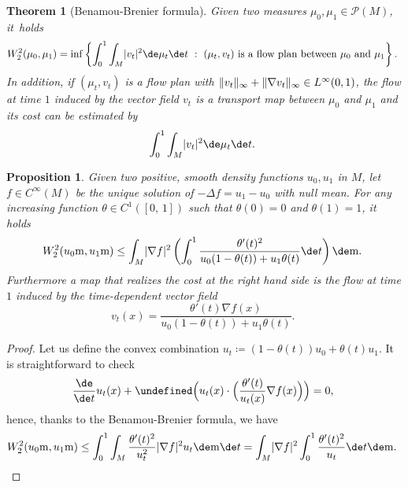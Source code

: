 \documentclass[10pt]{amsart}
\theoremstyle{plain}
\newtheorem{theorem}[theorem]{Theorem}
\newtheorem{proposition}[proposition]{Proposition}
\theoremstyle{definition}
\numberwithin{equation}{section}
\newcommand{\defeq}{\ensuremath{\coloneqq}}
\newcommand{\lapl}{\ensuremath{\Delta}}
\newcommand{\prob}{\ensuremath{\mathcal{P}}}
\newcommand{\cc}[2]{\ensuremath{\left[#1,\,#2\right]}}
\renewcommand{\comma}{\ensuremath{\text{, }}}
\newcommand{\comma}{\ensuremath{\text{, }}}
\newcommand{\fullstop}{\ensuremath{\text{. }}}
\newcommand{\st}{\ensuremath{\ :\ }}
\newcommand{\m}{\ensuremath{\mathrm m}}
\let\div\undefined
\DeclareMathOperator{\div}{div}
\DeclarePairedDelimiter\abs{\lvert}{\rvert}
\DeclarePairedDelimiter\norm{\lVert}{\rVert}
\begin{document}
\begin{theorem}[Benamou-Brenier formula]
Given two measures $\mu_0,\mu_1\in\prob(M)$, it~holds
\begin{equation*}
W_2^2(\mu_0, \mu_1) =
\inf\left\{\int_0^1\int_M \abs{v_t}^2\de\mu_t \de t\st (\mu_t, v_t)\text{ is a flow plan
between $\mu_0$ and $\mu_1$}\right\}\fullstop
\end{equation*}
In addition, if $(\mu_t, v_t)$ is a flow plan with $\norm{v_t}_\infty+\norm{\nabla v_t}_\infty\in L^\infty(0,1)$, the flow at time $1$ induced by the vector
field $v_t$ is a transport map between $\mu_0$ and $\mu_1$ and its cost can be estimated by
\begin{equation*}
\int_0^1\int_M \abs{v_t}^2\de\mu_t \de t\fullstop
\end{equation*}
\end{theorem}

\begin{proposition}\label{prop:transport_bound}
Given two positive, smooth density functions $u_0, u_1$ in $M$, let $f\in C^\infty(M)$ be the unique solution
of $-\lapl f = u_1-u_0$ with null mean.
For any increasing function $\theta\in C^1(\cc01)$ such that $\theta(0)=0$ and $\theta(1)=1$, it holds
\begin{equation*}
W_2^2(u_0\m, u_1\m)
\le \int_M\abs{\nabla f}^2
\left(\int_0^1\frac{\theta'(t)^2}{u_0(1-\theta(t))+u_1\theta(t)}\de t\right)
\de\m \fullstop
\end{equation*}
Furthermore a map that realizes the cost at the right hand side is the flow at time $1$ induced
by the time-dependent vector field
\begin{equation*}
v_t(x) = \frac{\theta'(t)\nabla f(x)}{u_0(1-\theta(t))+u_1\theta(t)} \fullstop
\end{equation*}
\end{proposition}
\begin{proof}
Let us define the convex combination $u_t\defeq (1-\theta(t))u_0+\theta(t)u_1$.
It is straightforward to check
\begin{equation*}
\frac{\de}{\de t}u_t(x)
+ \div\Bigl(u_t(x)\cdot\Bigl(\frac{\theta'(t)}{u_t(x)}\nabla f(x)\Bigr)\Bigr) = 0 \comma
\end{equation*}
hence, thanks to the Benamou-Brenier formula, we have
\begin{equation*}
W_2^2(u_0\m, u_1\m)\le
\int_0^1 \int_M \frac{\theta'(t)^2}{u_t^2}\abs{\nabla f}^2 u_t\de\m\de t
= \int_M\abs{\nabla f}^2\int_0^1\frac{\theta'(t)^2}{u_t}\de t\de\m \fullstop\qedhere
\end{equation*}
\end{proof}
\end{document}
